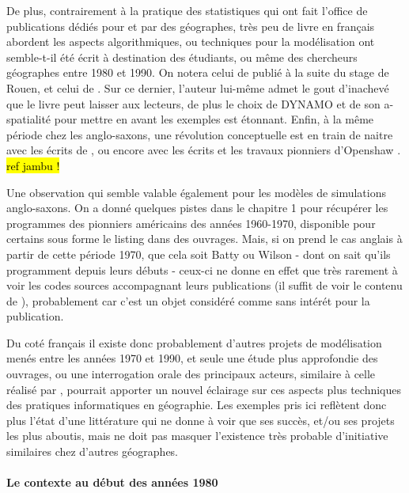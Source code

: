 De plus, contrairement à la pratique des statistiques qui ont fait l'office de publications dédiés pour et par des géographes, très peu de livre en français abordent les aspects algorithmiques, ou techniques pour la modélisation ont semble-t-il été écrit à destination des étudiants, ou même des chercheurs géographes entre 1980 et 1990. On notera celui de \textcite{Guermond1984} publié à la suite du stage de Rouen, et celui de \textcite{Dauphine1987}. Sur ce dernier, l'auteur lui-même admet le gout d'inachevé que le livre peut laisser aux lecteurs, de plus le choix de DYNAMO et de son a-spatialité pour mettre en avant les exemples est étonnant. Enfin, à la même période chez les anglo-saxons, une révolution conceptuelle est en train de naitre avec les écrits de \textcite{Couclelis1985}, ou encore avec les écrits et les travaux pionniers d'Openshaw \textcites{Openshaw1983, Openshaw1988, Openshaw2000}. \hl{ref jambu !}

Une observation qui semble valable également pour les modèles de simulations anglo-saxons. On a donné quelques pistes dans le chapitre 1 pour récupérer les programmes des pionniers américains des années 1960-1970, disponible pour certains sous forme le listing dans des ouvrages. Mais, si on prend le cas anglais à partir de cette période 1970, que cela soit Batty ou Wilson - dont on sait qu'ils programment  depuis leurs débuts - ceux-ci ne donne en effet que très rarement à voir les codes sources accompagnant leurs publications (il suffit de voir le contenu de \autocite{Batty1976}), probablement car c'est un objet considéré comme sans intérét pour la publication.

Du coté français il existe donc probablement d'autres projets de modélisation menés entre les années 1970 et 1990, et seule une étude plus approfondie des ouvrages, ou une interrogation orale des principaux acteurs, similaire à celle réalisé par \textcite{Cuyala2014}, pourrait apporter un nouvel éclairage sur ces aspects plus techniques des pratiques informatiques en géographie. Les exemples pris ici reflètent donc plus l'état d'une littérature qui ne donne à voir que ses succès, et/ou ses projets les plus aboutis, mais ne doit pas masquer l'existence très probable d'initiative similaires chez d'autres géographes.

\paragraph{Le contexte au début des années 1980}

